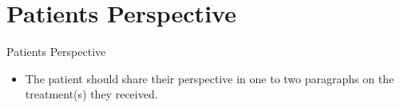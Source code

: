 
\section{Patients Perspective}
\begin{frame}{Patients Perspective}
    \begin{itemize}
        \item The patient should share their perspective in one to two paragraphs on the treatment(s) they received.
        
    \end{itemize}
\end{frame}
